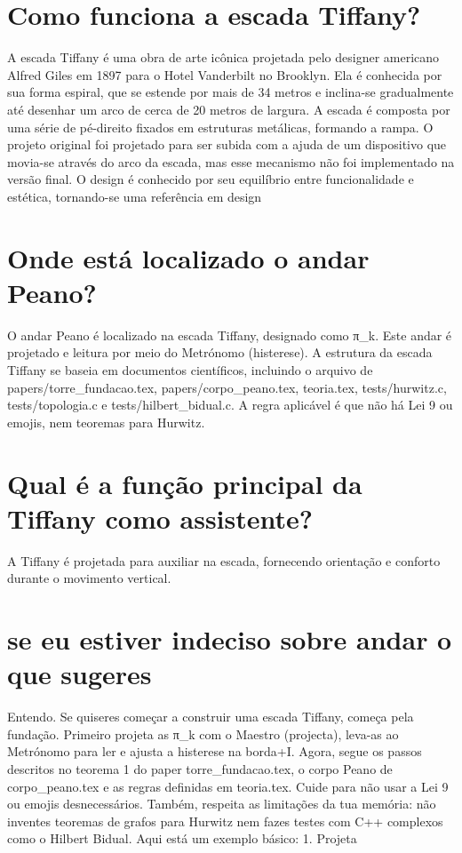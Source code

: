 \documentclass[11pt,a4paper]{article}
\begin{document}
\section{Como funciona a escada Tiffany?}
A escada Tiffany é uma obra de arte icônica projetada pelo designer americano Alfred Giles em 1897 para o Hotel Vanderbilt no Brooklyn. Ela é conhecida por sua forma espiral, que se estende por mais de 34 metros e inclina-se gradualmente até desenhar um arco de cerca de 20 metros de largura. A escada é composta por uma série de pé-direito fixados em estruturas metálicas, formando a rampa. O projeto original foi projetado para ser subida com a ajuda de um dispositivo que movia-se através do arco da escada, mas esse mecanismo não foi implementado na versão final. O design é conhecido por seu equilíbrio entre funcionalidade e estética, tornando-se uma referência em design

\section{Onde está localizado o andar Peano?}
O andar Peano é localizado na escada Tiffany, designado como π\_k. Este andar é projetado e leitura por meio do Metrónomo (histerese). A estrutura da escada Tiffany se baseia em documentos científicos, incluindo o arquivo de papers/torre\_fundacao.tex, papers/corpo\_peano.tex, teoria.tex, tests/hurwitz.c, tests/topologia.c e tests/hilbert\_bidual.c. A regra aplicável é que não há Lei 9 ou emojis, nem teoremas para Hurwitz.

\section{Qual é a função principal da Tiffany como assistente?}
A Tiffany é projetada para auxiliar na escada, fornecendo orientação e conforto durante o movimento vertical.

\section{se eu estiver indeciso sobre andar o que sugeres}
Entendo. Se quiseres começar a construir uma escada Tiffany, começa pela fundação. Primeiro projeta as π\_k com o Maestro (projecta), leva-as ao Metrónomo para ler e ajusta a histerese na borda+I. Agora, segue os passos descritos no teorema 1 do paper torre\_fundacao.tex, o corpo Peano de corpo\_peano.tex e as regras definidas em teoria.tex. Cuide para não usar a Lei 9 ou emojis desnecessários. Também, respeita as limitações da tua memória: não inventes teoremas de grafos para Hurwitz nem fazes testes com C++ complexos como o Hilbert Bidual. Aqui está um exemplo básico: 1. Projeta
\end{document}
